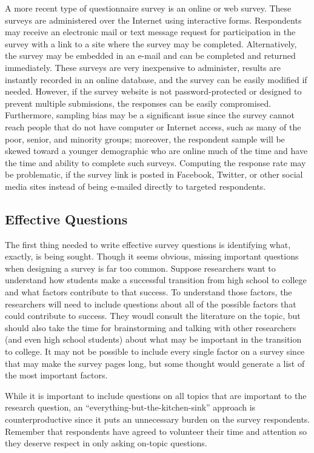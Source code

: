 A more recent type of questionnaire survey is an online or web survey. These surveys are administered over the Internet using interactive forms. Respondents may receive an electronic mail or text message request for participation in the survey with a link to a site where the survey may be completed. Alternatively, the survey may be embedded in an e-mail and can be completed and returned immediately. These surveys are very inexpensive to administer, results are instantly recorded in an online database, and the survey can be easily modified if needed. However, if the survey website is not password-protected or designed to prevent multiple submissions, the responses can be easily compromised. Furthermore, sampling bias may be a significant issue since the survey cannot reach people that do not have computer or Internet access, such as many of the poor, senior, and minority groups; moreover, the respondent sample will be skewed toward a younger demographic who are online much of the time and have the time and ability to complete such surveys. Computing the response rate may be problematic, if the survey link is posted in Facebook, Twitter, or other social media sites instead of being e-mailed directly to targeted respondents. 

\subsection{Effective Questions}

The first thing needed to write effective survey questions is identifying what, exactly, is being sought. Though it seems obvious, missing important questions when designing a survey is far too common. Suppose researchers want to understand how students make a successful transition from high school to college and what factors contribute to that success. To understand those factors, the researchers will need to include questions about all of the possible factors that could contribute to success. They woudl consult the literature on the topic, but should also take the time for brainstorming and talking with other researchers (and even high school students) about what may be important in the transition to college. It may not be possible to include every single factor on a survey since that may make the survey pages long, but some thought would generate a list of the most important factors.

While it is important to include questions on all topics that are important to the research question, an ``everything-but-the-kitchen-sink'' approach is counterproductive since it puts an unnecessary burden on the survey respondents. Remember that respondents have agreed to volunteer their time and attention so they deserve respect in only asking on-topic questions.

